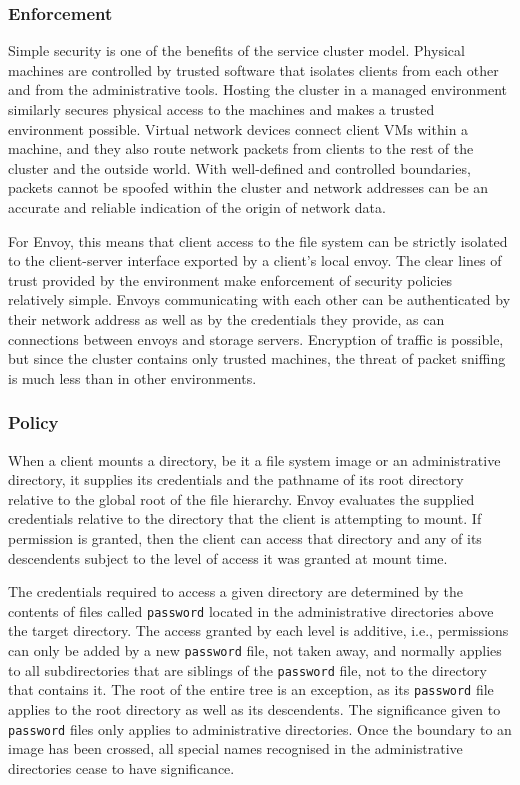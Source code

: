 \subsubsection{Enforcement}

Simple security is one of the benefits of the service cluster model. Physical machines are controlled by trusted software that isolates clients from each other and from the administrative tools. Hosting the cluster in a managed environment similarly secures physical access to the machines and makes a trusted environment possible. Virtual network devices connect client VMs within a machine, and they also route network packets from clients to the rest of the cluster and the outside world. With well-defined and controlled boundaries, packets cannot be spoofed within the cluster and network addresses can be an accurate and reliable indication of the origin of network data.

For Envoy, this means that client access to the file system can be strictly isolated to the client-server interface exported by a client's local envoy. The clear lines of trust provided by the environment make enforcement of security policies relatively simple. Envoys communicating with each other can be authenticated by their network address as well as by the credentials they provide, as can connections between envoys and storage servers. Encryption of traffic is possible, but since the cluster contains only trusted machines, the threat of packet sniffing is much less than in other environments.

\subsubsection{Policy}

When a client mounts a directory, be it a file system image or an administrative directory, it supplies its credentials and the pathname of its root directory relative to the global root of the file hierarchy. Envoy evaluates the supplied credentials relative to the directory that the client is attempting to mount. If permission is granted, then the client can access that directory and any of its descendents subject to the level of access it was granted at mount time.

The credentials required to access a given directory are determined by the contents of files called \texttt{password} located in the administrative directories above the target directory. The access granted by each level is additive, i.e., permissions can only be added by a new \texttt{password} file, not taken away, and normally applies to all subdirectories that are siblings of the \texttt{password} file, not to the directory that contains it. The root of the entire tree is an exception, as its \texttt{password} file applies to the root directory as well as its descendents. The significance given to \texttt{password} files only applies to administrative directories. Once the boundary to an image has been crossed, all special names recognised in the administrative directories cease to have significance.


